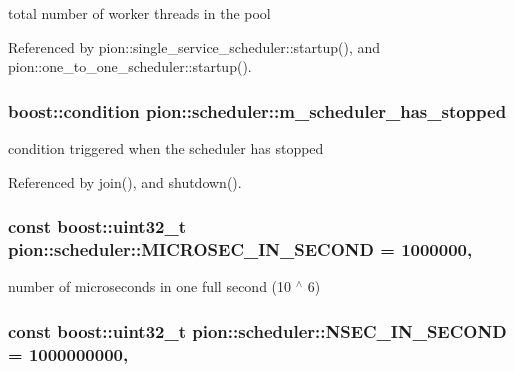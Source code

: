 total number of worker threads in the pool 



Referenced by pion\-::single\-\_\-service\-\_\-scheduler\-::startup(), and pion\-::one\-\_\-to\-\_\-one\-\_\-scheduler\-::startup().

\hypertarget{classpion_1_1scheduler_ab5321fccd4a1136f4358cce8679d22fd}{
\subsubsection[{m\-\_\-scheduler\-\_\-has\-\_\-stopped}]{\setlength{\rightskip}{0pt plus 5cm}boost\-::condition pion\-::scheduler\-::m\-\_\-scheduler\-\_\-has\-\_\-stopped\hspace{0.3cm}{\ttfamily [protected]}}}\label{classpion_1_1scheduler_ab5321fccd4a1136f4358cce8679d22fd}


condition triggered when the scheduler has stopped 



Referenced by join(), and shutdown().

\hypertarget{classpion_1_1scheduler_acbe8f3104aa4713c93bbf3f2abe8615a}{
\subsubsection[{M\-I\-C\-R\-O\-S\-E\-C\-\_\-\-I\-N\-\_\-\-S\-E\-C\-O\-N\-D}]{\setlength{\rightskip}{0pt plus 5cm}const boost\-::uint32\-\_\-t pion\-::scheduler\-::\-M\-I\-C\-R\-O\-S\-E\-C\-\_\-\-I\-N\-\_\-\-S\-E\-C\-O\-N\-D = 1000000\hspace{0.3cm}{\ttfamily [static]}, {\ttfamily [protected]}}}\label{classpion_1_1scheduler_acbe8f3104aa4713c93bbf3f2abe8615a}


number of microseconds in one full second (10 $^\wedge$ 6) 

\hypertarget{classpion_1_1scheduler_aa5633b15c629c78c2aeb451ae428ea25}{
\subsubsection[{N\-S\-E\-C\-\_\-\-I\-N\-\_\-\-S\-E\-C\-O\-N\-D}]{\setlength{\rightskip}{0pt plus 5cm}const boost\-::uint32\-\_\-t pion\-::scheduler\-::\-N\-S\-E\-C\-\_\-\-I\-N\-\_\-\-S\-E\-C\-O\-N\-D = 1000000000\hspace{0.3cm}{\ttfamily [static]}, {\ttfamily [protected]}}}\label{classpion_1_1scheduler_aa5633b15c629c78c2aeb451ae428ea25}


